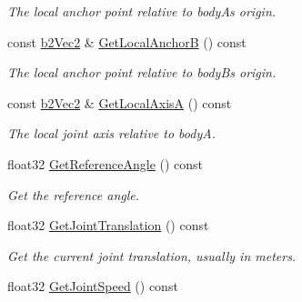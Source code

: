 \begin{DoxyCompactItemize}
\begin{DoxyCompactList}\small\item\em The local anchor point relative to bodyA\textquotesingle{}s origin. \end{DoxyCompactList}\item 
const \hyperlink{structb2_vec2}{b2\+Vec2} \& \hyperlink{classb2_prismatic_joint_a5591358eced21a8845744a8c47b7df9d}{Get\+Local\+AnchorB} () const \hypertarget{classb2_prismatic_joint_a5591358eced21a8845744a8c47b7df9d}{}\label{classb2_prismatic_joint_a5591358eced21a8845744a8c47b7df9d}

\begin{DoxyCompactList}\small\item\em The local anchor point relative to bodyB\textquotesingle{}s origin. \end{DoxyCompactList}\item 
const \hyperlink{structb2_vec2}{b2\+Vec2} \& \hyperlink{classb2_prismatic_joint_ab1aff69853c5ddb89ed8efdf8a0f4376}{Get\+Local\+AxisA} () const \hypertarget{classb2_prismatic_joint_ab1aff69853c5ddb89ed8efdf8a0f4376}{}\label{classb2_prismatic_joint_ab1aff69853c5ddb89ed8efdf8a0f4376}

\begin{DoxyCompactList}\small\item\em The local joint axis relative to bodyA. \end{DoxyCompactList}\item 
float32 \hyperlink{classb2_prismatic_joint_ae9e0a48367f191b2dd6a5bc05364a372}{Get\+Reference\+Angle} () const \hypertarget{classb2_prismatic_joint_ae9e0a48367f191b2dd6a5bc05364a372}{}\label{classb2_prismatic_joint_ae9e0a48367f191b2dd6a5bc05364a372}

\begin{DoxyCompactList}\small\item\em Get the reference angle. \end{DoxyCompactList}\item 
float32 \hyperlink{classb2_prismatic_joint_ade994ac79315258c80bccceef371df57}{Get\+Joint\+Translation} () const \hypertarget{classb2_prismatic_joint_ade994ac79315258c80bccceef371df57}{}\label{classb2_prismatic_joint_ade994ac79315258c80bccceef371df57}

\begin{DoxyCompactList}\small\item\em Get the current joint translation, usually in meters. \end{DoxyCompactList}\item 
float32 \hyperlink{classb2_prismatic_joint_a221aa1c6253686c96a02ecdd99c84b4c}{Get\+Joint\+Speed} () const \hypertarget{classb2_prismatic_joint_a221aa1c6253686c96a02ecdd99c84b4c}{}\label{classb2_prismatic_joint_a221aa1c6253686c96a02ecdd99c84b4c}


\end{DoxyCompactItemize}
